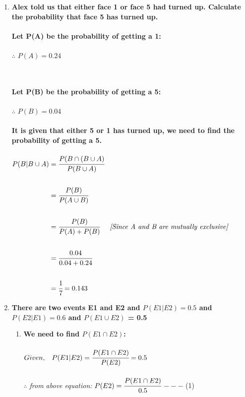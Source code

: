 \documentclass{article}
\begin{document}
\begin{enumerate}
\item \large 

\textbf{Alex told us that either face 1 or face 5 had turned up. Calculate the probability that
face 5 has turned up.}\\\\



\textbf{Let P(A) be the probability of getting a 1:} \\\\
$\therefore$ $P(A) = 0.24$\\\\\

\textbf{Let P(B) be the probability of getting a 5: } \\\\
$\therefore$ $P(B) = 0.04$\\\\

\textbf{It is given that either 5 or 1 has turned up, we need to find the probability of getting a 5.}\\\\

$\begin{aligned}
P(B|B \cup A) &= \cfrac{P(B \cap (B \cup A)}{P(B \cup A)} \\\\
&= \cfrac{P(B)}{P(A \cup B)}\\\\
&= \cfrac{P(B)}{P(A) + P(B)}\hspace{5mm} \textit{[Since A and B are mutually exclusive]}    \\\\
&= \cfrac{0.04}{0.04 + 0.24} \\\\
&= \cfrac{1}{7} = 0.143
\end{aligned}$

\newpage

\item \large 
\textbf{There are two events E1 and E2 and $P(E1 | E2) = 0.5$ and $P(E2 | E1) = 0.6$ and $P(E1 \cup E2)$ = 0.5}
\begin{enumerate}
    \item 
    \textbf{We need to find $P(E1 \cap E2)$: }\\\\
    $Given, \hspace{3mm}P(E1|E2) = \cfrac{P(E1 \cap E2)}{P(E2)} = 0.5$\\\\
    $\therefore$ \textit{from above equation: } $P(E2) = \cfrac{P(E1 \cap E2)} {0.5}$ \hspace{5mm} \textit{}{$---$ (1)}\\\\\\


\end{enumerate}
\end{enumerate}
\end{document}
